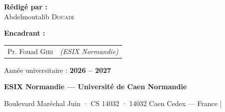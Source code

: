 \vspace{1.0cm}

\noindent
\begin{minipage}[t]{0.42\textwidth}
  {\large\textbf{Rédigé par :}}\\[0.3cm]
  Abdelmoutalib \textsc{Douadi}
\end{minipage}
\hfill
\begin{minipage}[t]{0.55\textwidth}
  \raggedleft
  {\large\textbf{Encadrant :}}\\[0.3cm]
  \begin{tabular}{ll}
    Pr. Fouad \textsc{Giri} & \textit{(ESIX Normandie)} \\
  \end{tabular}
\end{minipage}

\vfill
\begin{center}
  {\normalsize Année universitaire : \textbf{2026 -- 2027}}
\end{center}

\noindent
\colorbox{isiBlue}{%
  \parbox{\dimexpr\textwidth\relax}{%
    \centering
    \color{white}
    \vspace*{0.2cm}\par
    {\large\bfseries ESIX Normandie --- Université de Caen Normandie}\par\vspace{0.15cm}
    {\small Boulevard Maréchal Juin · CS 14032 · 14032 Caen Cedex --- France \quad|}\\\par
    \vspace*{0.2cm}
  }%
}

\restoregeometry

\clearpage